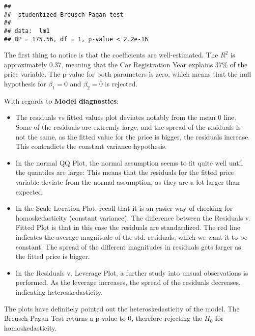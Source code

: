 \documentclass[
]{article}
\begin{document}
\begin{verbatim}
## 
##  studentized Breusch-Pagan test
## 
## data:  lm1
## BP = 175.56, df = 1, p-value < 2.2e-16
\end{verbatim}

The first thing to notice is that the coefficients are well-estimated.
The \(R^2\) is approximately 0.37, meaning that the Car Registration
Year explains 37\% of the price variable. The p-value for both
parameters is zero, which means that the null hypothesis for
\(\beta_1 = 0\) and \(\beta_2 = 0\) is rejected.

With regards to \textbf{Model diagnostics}:

\begin{itemize}
  
  \item The residuals vs fitted values plot deviates 
  notably from the mean 0 line. Some of the residuals are extremly large, and the     spread of the residuals is not the same, as the fitted value for the price is 
  bigger, the residuals increase. This contradicts the constant variance hypothesis.

  \item In the normal QQ Plot, the normal assumption seems to fit quite well until 
  the quantiles are large: This means that the residuals for the fitted price         variable deviate from the normal assumption, as they are a lot larger than     
  expected.

  \item In the Scale-Location Plot, recall that it is an easier way of 
  checking for homoskedasticity (constant variance). The difference between the 
  Residuals v. Fitted Plot is that in this case the residuals are standardized.
  The red line indicates the average magnitude of the std. residuals, which we
  want it to be constant. The spread of the different magnitudes in residuals
  gets larger as the fitted price is bigger.
  
  \item In the Residuals v. Leverage Plot, a further study into unsual 
  observations is performed. As the leverage increases, the spread of the 
  residuals decreases, indicating heteroskedasticity.
  

\end{itemize}

The plots have definitely pointed out the heteroskedasticity of the
model. The Breusch-Pagan Test returns a p-value to 0, therefore
rejecting the \(H_0\) for homoskedasticity.
\end{document}
